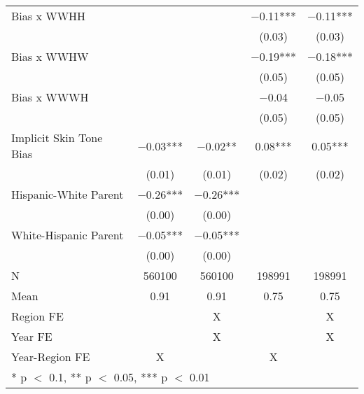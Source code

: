 \begin{longtable}[t]{lcccc}
Bias x WWHH &  &  & \num{-0.11}*** & \num{-0.11}***\\
 &  &  & (\num{0.03}) & (\num{0.03})\\
Bias x WWHW &  &  & \num{-0.19}*** & \num{-0.18}***\\
 &  &  & (\num{0.05}) & \vphantom{1} (\num{0.05})\\
Bias x WWWH &  &  & \num{-0.04} & \num{-0.05}\\
 &  &  & (\num{0.05}) & (\num{0.05})\\
Implicit Skin Tone Bias & \num{-0.03}*** & \num{-0.02}** & \num{0.08}*** & \num{0.05}***\\
 & (\num{0.01}) & (\num{0.01}) & (\num{0.02}) & (\num{0.02})\\
Hispanic-White Parent & \num{-0.26}*** & \num{-0.26}*** &  & \\
 & (\num{0.00}) & (\num{0.00}) &  \vphantom{1} & \\
White-Hispanic Parent & \num{-0.05}*** & \num{-0.05}*** &  & \\
 & (\num{0.00}) & (\num{0.00}) &  & \\
\midrule
N & \num{560100} & \num{560100} & \num{198991} & \num{198991}\\
Mean & \num{0.91} & \num{0.91} & \num{0.75} & \num{0.75}\\
Region FE &  & X &  & X\\
Year FE &  & X &  & X\\
Year-Region FE & X &  & X & \\*
\multicolumn{5}{l}{\rule{0pt}{1em}* p $<$ 0.1, ** p $<$ 0.05, *** p $<$ 0.01}\\
\end{longtable}

